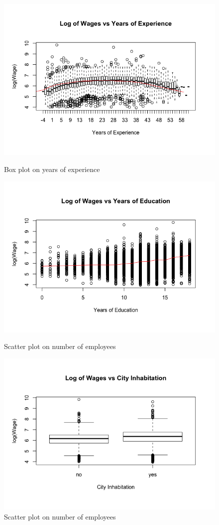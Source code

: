 \documentclass{article}
\begin{document}
\begin{figure}
\begin{minipage}{.45\textwidth}
          \includegraphics[scale=0.35]{boxexp}
          \caption{Box plot on years of experience}
          \label{fig:boxexp}
        \end{minipage}
        \begin{minipage}{.45\textwidth}
          \centering
          \includegraphics[scale=0.35]{scatteredu}
          \caption{Scatter plot on number of employees}
          \label{fig:scatteredu}

          \includegraphics[scale=0.35]{boxcity}
          \caption{Scatter plot on number of employees}
          \label{fig:boxcity}


\end{minipage}
\end{figure}
\end{document}
